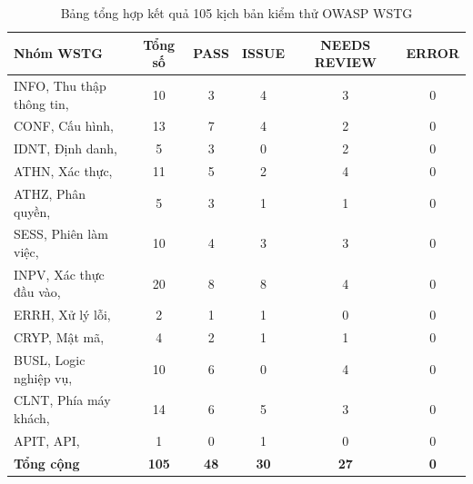 \begin{table}[h]
\centering
\renewcommand{\arraystretch}{1.3}
\begin{tabular}{|l|c|c|c|c|c|}
\hline
\textbf{Nhóm WSTG} & \textbf{Tổng số} & \textbf{PASS} & \textbf{ISSUE} & \textbf{NEEDS REVIEW} & \textbf{ERROR} \\
\hline
INFO, Thu thập thông tin, & 10 & 3 & 4 & 3 & 0 \\
\hline
CONF, Cấu hình, & 13 & 7 & 4 & 2 & 0 \\
\hline
IDNT, Định danh, & 5 & 3 & 0 & 2 & 0 \\
\hline
ATHN, Xác thực, & 11 & 5 & 2 & 4 & 0 \\
\hline
ATHZ, Phân quyền, & 5 & 3 & 1 & 1 & 0 \\
\hline
SESS, Phiên làm việc, & 10 & 4 & 3 & 3 & 0 \\
\hline
INPV, Xác thực đầu vào, & 20 & 8 & 8 & 4 & 0 \\
\hline
ERRH, Xử lý lỗi, & 2 & 1 & 1 & 0 & 0 \\
\hline
CRYP, Mật mã, & 4 & 2 & 1 & 1 & 0 \\
\hline
BUSL, Logic nghiệp vụ, & 10 & 6 & 0 & 4 & 0 \\
\hline
CLNT, Phía máy khách, & 14 & 6 & 5 & 3 & 0 \\
\hline
APIT, API, & 1 & 0 & 1 & 0 & 0 \\
\hline
\textbf{Tổng cộng} & \textbf{105} & \textbf{48} & \textbf{30} & \textbf{27} & \textbf{0} \\
\hline
\end{tabular}
\caption{Bảng tổng hợp kết quả 105 kịch bản kiểm thử OWASP WSTG}
\end{table}

